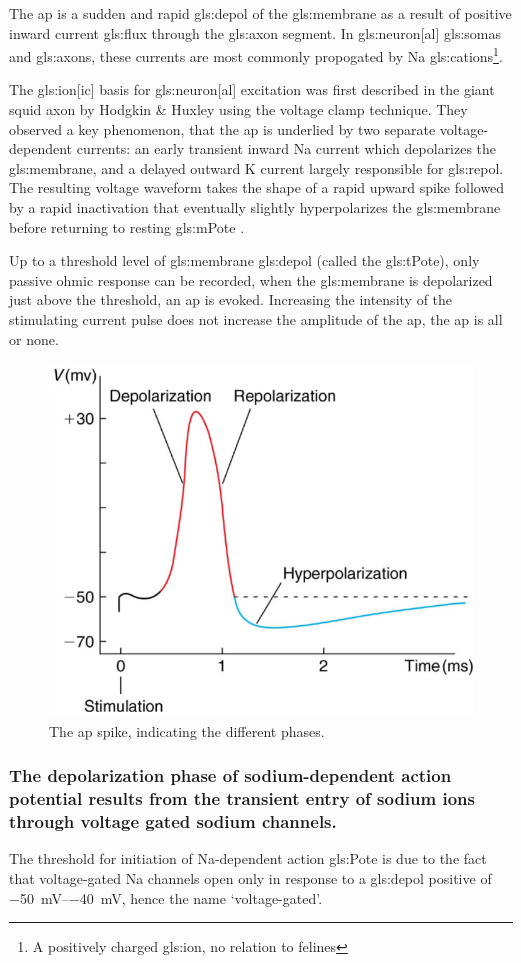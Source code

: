 \documentclass[class={.NoTouch/myProject}, crop=false]{standalone}
\begin{document}
The \gls{ap} is a sudden and rapid \gls{gls:depol} of the \gls{gls:membrane} as a result of positive inward current \gls{gls:flux} through the \gls{gls:axon} segment. In \gls{gls:neuron}[al] \glspl{gls:soma} and \glspl{gls:axon}, these currents are most commonly propogated by \gls{Na} \glspl{gls:cation}\footnote{A positively charged \gls{gls:ion}, no relation to felines}.

The \gls{gls:ion}[ic] basis for \gls{gls:neuron}[al] excitation was first described in the giant squid axon by Hodgkin \& Huxley  using the voltage clamp technique. They observed a key phenomenon, that the \gls{ap} is underlied by two separate voltage-dependent currents: an early transient inward \gls{Na} current which depolarizes the \gls{gls:membrane}, and a delayed outward \gls{K} current largely responsible for \gls{gls:repol}. The resulting voltage waveform takes the shape of a rapid upward spike followed by a rapid inactivation that eventually slightly hyperpolarizes the \gls{gls:membrane} before returning to resting \gls{gls:mPote} .

Up to a threshold level of \gls{gls:membrane} \gls{gls:depol} (called the \gls{gls:tPote}), only passive ohmic response can be recorded, when the \gls{gls:membrane} is depolarized just above the threshold, an \gls{ap} is evoked. 
Increasing the intensity of the stimulating current pulse does not increase the amplitude of the \gls{ap},  the \gls{ap} is all or none. 
\begin{figure}[H]
    \centering
    \includegraphics[width=0.5\linewidth]{Pictures//Anakin/AP.png}
    \caption{The \gls{ap} spike, indicating the different phases.}
    \label{fig:AP}
\end{figure}

\subsubsection{The depolarization phase of sodium-dependent action potential results from the transient entry of sodium ions through voltage gated sodium channels.}
The threshold  for initiation of \gls{Na}-dependent  action  \gls{gls:Pote} is due to the fact that voltage-gated \gls{Na} channels open only  in  response  to  a  \gls{gls:depol}  positive  of \qtyrange{-50}{-40}{\mV}, hence the name `voltage-gated'. 
\end{document}
